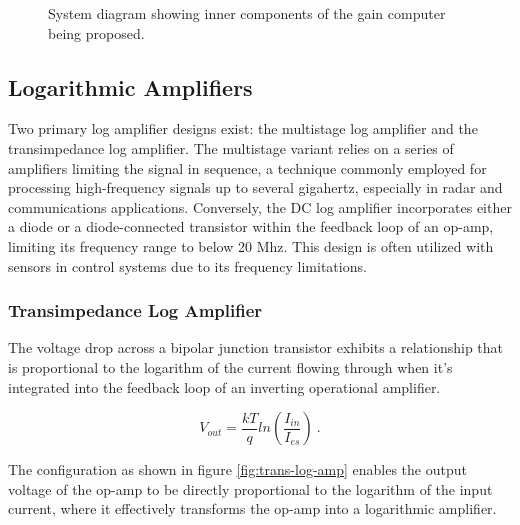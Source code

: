 \documentclass[10pt]{article}
\begin{document}
\begin{multicols*}{2}
\begin{figure}[!t]
{\begin{tikzpicture}
                
                                        \end{tikzpicture}%
                                    }
                
                                    \caption{System diagram showing inner components of the gain computer being proposed.}
                                    \label{fig:gain-comp-diagram}
                
                                \end{figure}
                
            \subsection{Logarithmic Amplifiers} \label{sect:log-amp}
                Two primary log amplifier designs exist: the multistage log amplifier and the transimpedance log amplifier. The multistage variant relies on a series of amplifiers limiting the signal in sequence, a technique commonly employed for processing high-frequency signals up to several gigahertz, especially in radar and communications applications. Conversely, the DC log amplifier incorporates either a diode or a diode-connected transistor within the feedback loop of an op-amp, limiting its frequency range to below 20 Mhz. This design is often utilized with sensors in control systems due to its frequency limitations.\par

                \subsubsection{Transimpedance Log Amplifier}
                    The voltage drop across a bipolar junction transistor exhibits a relationship that is proportional to the logarithm of the current flowing through when it's integrated into the feedback loop of an inverting operational amplifier. 
                    
                        \begin{equation}
                            V_{out}=\frac{kT}{q}ln(\frac{I_{in}}{I_{es}})\ .
                        \end{equation}
                    
                    \noindent The configuration as shown in figure \ref{fig:trans-log-amp} enables the output voltage of the op-amp to be directly proportional to the logarithm of the input current, where it effectively transforms the op-amp into a logarithmic amplifier.\par


\end{multicols*}
\end{document}
